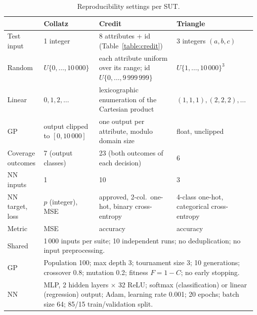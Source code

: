 \documentclass[runningheads]{llncs}
\begin{document}
\begin{table}[!htb]
\centering
\caption{Reproducibility settings per SUT.}
\label{tab:repro}
\scriptsize
\setlength{\tabcolsep}{3pt}
\renewcommand{\arraystretch}{1.1}
\begin{tabular}{|l|p{2.9cm}|p{2.9cm}|p{2.9cm}|}
\hline
 & \textbf{Collatz} & \textbf{Credit} & \textbf{Triangle} \\
\hline
Test input & 1 integer & 8 attributes + id (Table~\ref{table:credit}) & 3 integers $(a,b,c)$ \\
Random & $U\{0,\dots,10\,000\}$ & each attribute uniform over its range; id $U\{0,\dots,9\,999\,999\}$ & $U\{1,\dots,10\,000\}^3$ \\
Linear & $0, 1, 2, \dots$ & lexicographic enumeration of the Cartesian product & $(1,1,1), (2,2,2), \dots$ \\
GP & output clipped to $[0, 10\,000]$ & one output per attribute, modulo domain size & float, unclipped \\
Coverage outcomes & 7 (output classes) & 23 (both outcomes of each decision) & 6 \\
NN inputs & 1 & 10 & 3 \\
NN target, loss & $p$ (integer), MSE & approved, 2-col.\ one-hot, binary cross-entropy & 4-class one-hot, categorical cross-entropy \\
Metric & MSE & accuracy & accuracy \\
\hline
Shared & \multicolumn{3}{p{9.1cm}|}{1\,000 inputs per suite; 10 independent runs; no deduplication; no input preprocessing.} \\
GP & \multicolumn{3}{p{9.1cm}|}{Population 100; max depth 3; tournament size 3; 10 generations; crossover 0.8; mutation 0.2; fitness $F=1-C$; no early stopping.} \\
NN & \multicolumn{3}{p{9.1cm}|}{MLP, 2 hidden layers $\times$ 32 ReLU; softmax (classification) or linear (regression) output; Adam, learning rate 0.001; 20 epochs; batch size 64; 85/15 train/validation split.} \\
\hline
\end{tabular}
\end{table}

\end{document}

